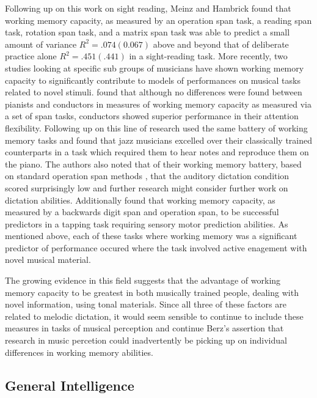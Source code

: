 \documentclass[]{book}
\begin{document}
Following up on this work on sight reading, Meinz and Hambrick \citep{meinzDeliberatePracticeNecessary2010} found that working memory capacity, as measured by an operation span task, a reading span task, rotation span task, and a matrix span task was able to predict a small amount of variance \(R^2=.074(0.067)\) above and beyond that of deliberate practice alone \(R^2=.451(.441)\) in a sight-reading task.
More recently, two studies looking at specific sub groups of musicians have shown working memory capacity to significantly contribute to models of performances on musical tasks related to novel stimuli.
\citep{wollnerAttentionalFlexibilityMemory2016} found that although no differences were found between pianists and conductors in measures of working memory capacity as measured via a set of span tasks, conductors showed superior performance in their attention flexibility.
Following up on this line of research \citep{nicholsScoreOneJazz2018} used the same battery of working memory tasks and found that jazz musicians excelled over their classically trained counterparts in a task which required them to hear notes and reproduce them on the piano.
The authors also noted that of their working memory battery, based on standard operation span methods \citep{engleWorkingMemoryCapacity2002}, that the auditory dictation condition scored surprisingly low and further research might consider further work on dictation abilities.
Additionally \citep{colleyWorkingMemoryAuditory2018} found that working memory capacity, as measured by a backwards digit span and operation span, to be successful predictors in a tapping task requiring sensory motor prediction abilities.
As mentioned above, each of these tasks where working memory was a significant predictor of performance occured where the task involved active enagement with novel musical material.

The growing evidence in this field suggests that the advantage of working memory capacity to be greatest in both musically trained people, dealing with novel information, using tonal materials.
Since all three of these factors are related to melodic dictation, it would seem sensible to continue to include these measures in tasks of musical perception and continue Berz's assertion that research in music percetion could inadvertently be picking up on individual differences in working memory abilities.

\hypertarget{general-intelligence}{%
\subsection{General Intelligence}\label{general-intelligence}}
\end{document}
